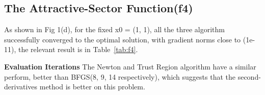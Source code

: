 \documentclass[12pt]{article}
\begin{document}
\begin{table}[h]
    \centering

    \caption{Optimization results for the Log-Ellipsoid Function.}
    \label{tab:f3}
\end{table}



\subsection{The Attractive-Sector Function(f4)}
As shown in  Fig 1(d), for the fixed x0 = (1, 1), all the three algorithm  successfully converged to the optimal solution, with gradient norms close to (1e-11), the relevant result is in Table~\ref{tab:f4}.

\textbf{Evaluation Iterations}  
The Newton and Trust Region algorithm have a similar perform, better than BFGS(8, 9, 14 respectively), which suggests that the second-derivatives method is better on this problem.
\end{document}
